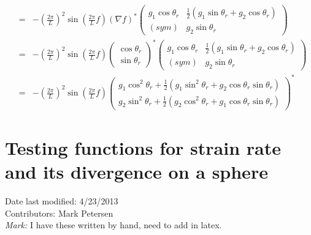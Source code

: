 \documentclass[11pt]{report}
\begin{document}
\begin{eqnarray}
&=& -\left(\frac{2\pi}{L}\right)^2
\sin{\left(\frac{2\pi}{L}f\right)}\left( \nabla f \right)^* 
\left(\begin{array}{cc} g_1\cos{\theta_r} & \frac{1}{2}\left( g_1\sin{\theta_r} + g_2\cos{\theta_r} \right)\\
                      (sym) & g_2\sin{\theta_r}  \end{array} \right)\\
&=& -\left(\frac{2\pi}{L}\right)^2
\sin{\left(\frac{2\pi}{L}f\right)}
\left( \begin{array}{c} \cos{\theta_r} \\ \sin{\theta_r} \end{array}    \right)  ^* 
\left(\begin{array}{cc} g_1\cos{\theta_r} & \frac{1}{2}\left( g_1\sin{\theta_r} + g_2\cos{\theta_r} \right)\\
                      (sym) & g_2\sin{\theta_r}  \end{array} \right)\\
&=& -\left(\frac{2\pi}{L}\right)^2
\sin{\left(\frac{2\pi}{L}f\right)}
\left(\begin{array}{c} g_1\cos^2{\theta_r} + \frac{1}{2}\left( g_1\sin^2{\theta_r} + g_2\cos{\theta_r}\sin{\theta_r} \right)\\
                       g_2\sin^2{\theta_r} + \frac{1}{2}\left( g_2\cos^2{\theta_r} + g_1\cos{\theta_r}\sin{\theta_r} \right) 
 \end{array} \right)^* 
\end{eqnarray}

\section{Testing functions for strain rate and its divergence on a sphere}
Date last modified: 4/23/2013 \\
Contributors: Mark Petersen \\

{\it Mark:} I have these written by hand, need to add in latex.






\end{document}
